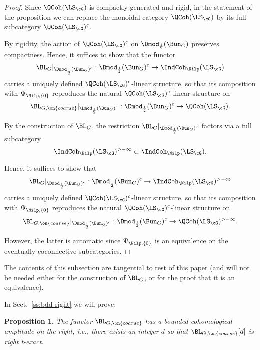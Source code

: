 \documentclass[9pt]{amsart}
\newtheorem{prop}[subsubsection]{Proposition}
\theoremstyle{remark}
\theoremstyle{definition}
\theoremstyle{remark}
\newcommand{\secref}[1]{Sect.~\ref{#1}}
\numberwithin{equation}{section}
\begin{document}
\begin{proof} 

Since $\QCoh(\LS_\cG)$ is compactly generated and rigid, in the statement of the proposition
we can replace the monoidal category $\QCoh(\LS_\cG)$ by its full subcategory $\QCoh(\LS_\cG)^c$. 

\medskip

By rigidity, the action of
$\QCoh(\LS_\cG)^c$ on $\Dmod_{\frac{1}{2}}(\Bun_G)$ preserves compactness.
Hence, it suffices to show that the functor
$$\BL_G|_{\Dmod_{\frac{1}{2}}(\Bun_G)^c}:\Dmod_{\frac{1}{2}}(\Bun_G)^c\to \IndCoh_\Nilp(\LS_\cG)$$
carries a uniquely defined $\QCoh(\LS_\cG)^c$-linear structure, so that its composition
with $\Psi_{\Nilp,\{0\}}$ reproduces the natural $\QCoh(\LS_\cG)^c$-linear structure on 
$$\BL_{G,\on{coarse}}|_{\Dmod_{\frac{1}{2}}(\Bun_G)^c}:\Dmod_{\frac{1}{2}}(\Bun_G)^c\to \QCoh(\LS_\cG).$$

\medskip

By the construction of $\BL_G$, the restriction $\BL_G|_{\Dmod_{\frac{1}{2}}(\Bun_G)^c}$ factors via 
a full subcategory 
$$\IndCoh_\Nilp(\LS_\cG)^{>-\infty}\subset \IndCoh_\Nilp(\LS_\cG).$$

Hence, it suffices to show that
$$\BL_G|_{\Dmod_{\frac{1}{2}}(\Bun_G)^c}:\Dmod_{\frac{1}{2}}(\Bun_G)^c\to \IndCoh_\Nilp(\LS_\cG)^{>-\infty}$$
carries a uniquely defined $\QCoh(\LS_\cG)^c$-linear structure, so that its composition
with $\Psi_{\Nilp,\{0\}}$ reproduces the natural $\QCoh(\LS_\cG)^c$-linear structure on 
$$\BL_{G,\on{coarse}}|_{\Dmod_{\frac{1}{2}}(\Bun_G)^c}:\Dmod_{\frac{1}{2}}(\Bun_G)^c\to \QCoh(\LS_\cG)^{>-\infty}.$$

However, the latter is automatic since $\Psi_{\Nilp,\{0\}}$ is an equivalence on the eventually coconnective
subcategories.

\end{proof}


The contents of this subsection are tangential to rest of this paper (and will not be needed either for
the construction of $\BL_G$, or for the proof that it is an equivalence). 

\sssec{}

In \secref{ss:bdd right} we will prove:

\begin{prop} \label{p:bdd right} 
The functor $\BL_{G,\on{coarse}}$ has a bounded cohomological amplitude on the right, i.e., there exists an integer $d$ so that 
$\BL_{G,\on{coarse}}[d]$ is right t-exact. 
\end{prop}
\end{document}

